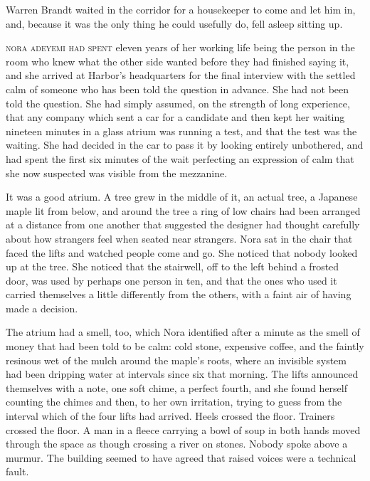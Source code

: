 Warren Brandt waited in the corridor for a housekeeper to come and let him in, and, because it was the only thing he could usefully do, fell asleep sitting up.


\textsc{nora adeyemi had spent} eleven years of her working life being the person in the room who knew what the other side wanted before they had finished saying it, and she arrived at Harbor's headquarters for the final interview with the settled calm of someone who has been told the question in advance. She had not been told the question. She had simply assumed, on the strength of long experience, that any company which sent a car for a candidate and then kept her waiting nineteen minutes in a glass atrium was running a test, and that the test was the waiting. She had decided in the car to pass it by looking entirely unbothered, and had spent the first six minutes of the wait perfecting an expression of calm that she now suspected was visible from the mezzanine.

It was a good atrium. A tree grew in the middle of it, an actual tree, a Japanese maple lit from below, and around the tree a ring of low chairs had been arranged at a distance from one another that suggested the designer had thought carefully about how strangers feel when seated near strangers. Nora sat in the chair that faced the lifts and watched people come and go. She noticed that nobody looked up at the tree. She noticed that the stairwell, off to the left behind a frosted door, was used by perhaps one person in ten, and that the ones who used it carried themselves a little differently from the others, with a faint air of having made a decision.

The atrium had a smell, too, which Nora identified after a minute as the smell of money that had been told to be calm: cold stone, expensive coffee, and the faintly resinous wet of the mulch around the maple's roots, where an invisible system had been dripping water at intervals since six that morning. The lifts announced themselves with a note, one soft chime, a perfect fourth, and she found herself counting the chimes and then, to her own irritation, trying to guess from the interval which of the four lifts had arrived. Heels crossed the floor. Trainers crossed the floor. A man in a fleece carrying a bowl of soup in both hands moved through the space as though crossing a river on stones. Nobody spoke above a murmur. The building seemed to have agreed that raised voices were a technical fault.

